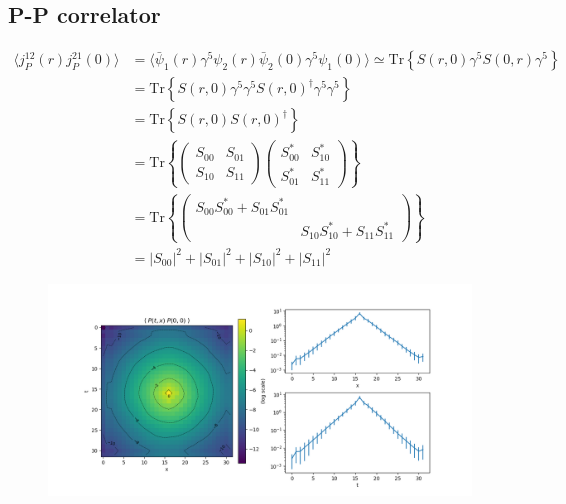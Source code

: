 \documentclass{article}
\newcommand{\Tr}[1]{\text{Tr}\left\{ #1 \right\}}
\begin{document}
\subsection{P-P correlator}

\begin{align*}
    \langle j_P^{12} (r) j_P^{21}(0) \rangle &= \langle \bar\psi_1(r) \gamma^5 \psi_2(r) \bar\psi_2(0) \gamma^5 \psi_1(0) \rangle \simeq \Tr{S(r, 0) \gamma^5 S(0, r) \gamma^5} \\
    &= \Tr{S(r, 0) \gamma^5 \gamma^5 S(r, 0)^\dagger \gamma^5 \gamma^5} \\
    &= \Tr{S(r, 0) S(r, 0)^\dagger} \\
    &= \Tr{ \begin{pmatrix} S_{00} & S_{01} \\ S_{10} & S_{11} \end{pmatrix} \begin{pmatrix} S_{00}^* & S_{10}^* \\ S_{01}^* & S_{11}^* \end{pmatrix} } \\
    &= \Tr{\begin{pmatrix} S_{00} S_{00}^* + S_{01} S_{01}^* &  \\ & S_{10} S_{10}^* + S_{11} S_{11}^* \end{pmatrix}} \\
    &= |S_{00}|^2 + |S_{01}|^2 + |S_{10}|^2 + |S_{11}|^2
\end{align*}

\begin{figure}[ht]
    \centering
    \includegraphics[width=\textwidth]{../plots/PP.png}
    \caption{}
    \label{}
\end{figure}
\end{document}
